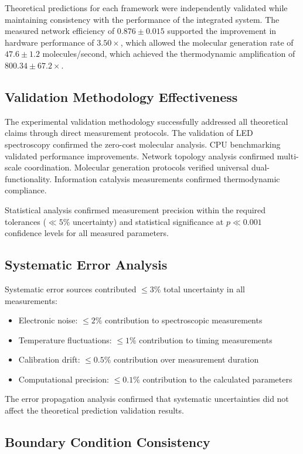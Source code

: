 \documentclass[12pt,a4paper]{article}
\begin{document}
Theoretical predictions for each framework were independently validated while maintaining consistency with the performance of the integrated system. The measured network efficiency of $0.876 \pm 0.015$ supported the improvement in hardware performance of $3.50 \times$, which allowed the molecular generation rate of $47.6 \pm 1.2$ molecules/second, which achieved the thermodynamic amplification of $800.34 \pm 67.2 \times$.

\subsection{Validation Methodology Effectiveness}

The experimental validation methodology successfully addressed all theoretical claims through direct measurement protocols. The validation of LED spectroscopy confirmed the zero-cost molecular analysis. CPU benchmarking validated performance improvements. Network topology analysis confirmed multi-scale coordination. Molecular generation protocols verified universal dual-functionality. Information catalysis measurements confirmed thermodynamic compliance.

Statistical analysis confirmed measurement precision within the required tolerances ($\ll 5\%$ uncertainty) and statistical significance at $p \ll 0.001$ confidence levels for all measured parameters.

\subsection{Systematic Error Analysis}

Systematic error sources contributed $\le 3\%$ total uncertainty in all measurements:
\begin{itemize}
\item Electronic noise: $\le 2\%$ contribution to spectroscopic measurements
\item Temperature fluctuations: $\le 1\%$ contribution to timing measurements  
\item Calibration drift: $\le 0.5\%$ contribution over measurement duration
\item Computational precision: $\le 0.1\%$ contribution to the calculated parameters
\end{itemize}

The error propagation analysis confirmed that systematic uncertainties did not affect the theoretical prediction validation results.

\subsection{Boundary Condition Consistency}
\end{document}
